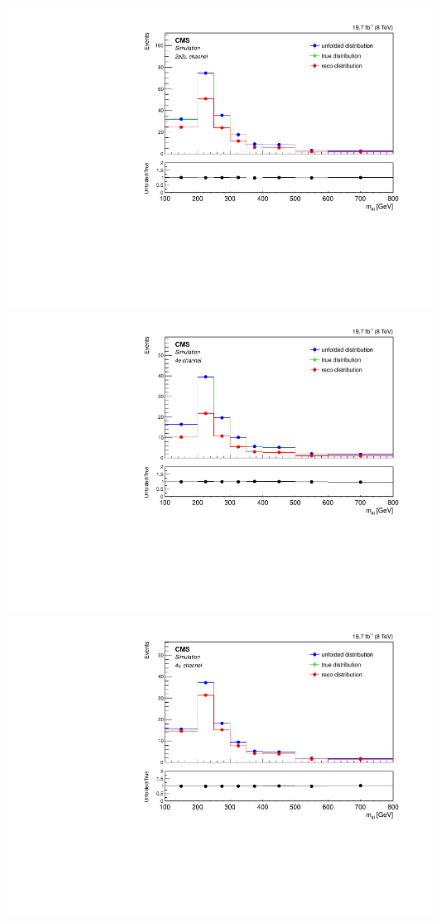 \begin{figure}[hbtp]
\begin{center}
    \includegraphics[width=0.8\cmsFigWidth]{Figures/Unfolding/MCTests/Mass_ZZTo2e2m_MadMatrix_PowDistr_FullSample_fr}
     \includegraphics[width=0.8\cmsFigWidth]{Figures/Unfolding/MCTests/Mass_ZZTo4e_PowMatrix_MadDistr_FullSample_fr}     
    \includegraphics[width=0.8\cmsFigWidth]{Figures/Unfolding/MCTests/Mass_ZZTo4m_PowMatrix_MadDistr_FullSample_fr}     

\end{center}
\end{figure}
